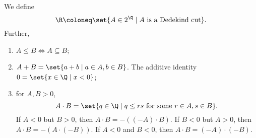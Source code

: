 \begin{definition}[\R] \label{def:R:dedekind}
    We define \[
        \R \coloneq \set{A \in 2^\Q \mid A \text{ is a Dedekind cut}}.
    \] Further,
    \begin{enumerate}
        \item $A \le B \iff A \subseteq B$;
        \item $A + B = \set{a + b \mid a \in A, b \in B}$.
        The additive identity $0 = \set{x \in \Q \mid x < 0}$;
        \item for $A, B > 0$, \[
            A \cdot B = \set{q \in \Q \mid q \le rs \text{ for some }
                r \in A, s \in B}.
        \] If $A < 0$ but $B > 0$, then $A \cdot B = -((-A) \cdot B)$.
        If $B < 0$ but $A > 0$, then $A \cdot B = -(A \cdot (-B))$.
        If $A < 0$ and $B < 0$, then $A \cdot B = (-A) \cdot (-B)$.
    \end{enumerate}
\end{definition}
